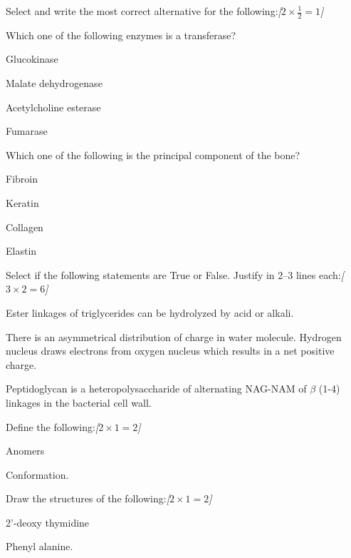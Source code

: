 \documentclass[11pt,a4paper]{article}
\newcommand{\pts}[1]{\hfill   \textit{[#1]}}
\begin{document}
\begin{parts}
  \item Select and write the most correct alternative for the following:\pts{$2  \times \frac{1}{2} = 1$}
  
\begin{parts}
    \item Which one of the following enzymes is a transferase?
    
\begin{parts}
      \item Glucokinase
      \item Malate dehydrogenase
      \item Acetylcholine esterase
      \item Fumarase
    \end{parts}
    
    \item Which one of the following is the principal component of the bone?
    
\begin{parts}
      \item Fibroin
      \item Keratin
      \item Collagen
      \item Elastin
    \end{parts}
  \end{parts}

  \item Select if the following statements are True or False. Justify in 2--3 lines each:\pts{$3  \times 2 = 6$}
  
\begin{parts}
    \item Ester linkages of triglycerides can be hydrolyzed by acid or alkali.
    \item There is an asymmetrical distribution of charge in water molecule. Hydrogen nucleus draws electrons from oxygen nucleus which results in a net positive charge.
    \item Peptidoglycan is a heteropolysaccharide of alternating NAG-NAM of $\beta$ (1-4) linkages in the bacterial cell wall.
  \end{parts}

  \item Define the following:\pts{$2  \times 1 = 2$}
  
\begin{parts}
    \item Anomers
    \item Conformation.
  \end{parts}

  \item Draw the structures of the following:\pts{$2  \times 1 = 2$}
  
\begin{parts}
    \item 2'-deoxy thymidine
    \item Phenyl alanine.
  \end{parts}
\end{parts}
\end{document}
